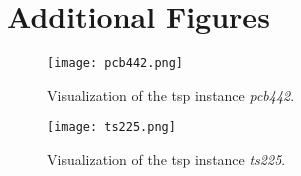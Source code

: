 \chapter{Additional Figures}

\begin{figure}[h]
	\centering
	\texttt{[image: pcb442.png]}
	\caption{Visualization of the \gls{tsp} instance \textit{pcb442}.}
	\label{fig:pcb442}
\end{figure}
\begin{figure}[h]
	\centering
	\texttt{[image: ts225.png]}
	\caption{Visualization of the \gls{tsp} instance \textit{ts225}.}
	\label{fig:ts225}
\end{figure}